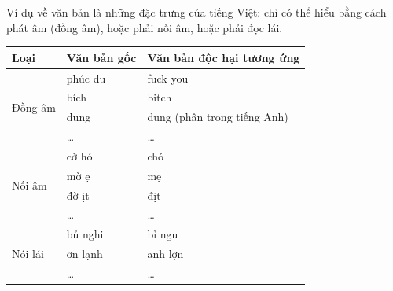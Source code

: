 Ví dụ về văn bản là những đặc trưng của tiếng Việt: chỉ có thể hiểu bằng cách phát âm (đồng âm), hoặc phải nối âm, hoặc phải đọc lái.
\begin{table}[htb]
    \centering
    \begin{tabular}{lll}
        \toprule
        \textbf{Loại}            & \textbf{Văn bản gốc} & \textbf{Văn bản độc hại tương ứng} \\\midrule
        \multirow{4}{*}{Đồng âm} & phúc du              & fuck you                           \\
                                 & bích                 & bitch                              \\
                                 & dung                 & dung (phân trong tiếng Anh)        \\
                                 & \dots                & \dots                              \\\midrule
        \multirow{4}{*}{Nối âm}  & cờ hó                & chó                                \\
                                 & mờ ẹ                 & mẹ                                 \\
                                 & đờ ịt                & địt                                \\
                                 & \dots                & \dots                              \\\midrule
        \multirow{3}{*}{Nói lái} & bủ nghi              & bỉ ngu                             \\
                                 & ơn lạnh              & anh lợn                            \\
                                 & \dots                & \dots                              \\
        \bottomrule
    \end{tabular}
\end{table}
\clearpage

